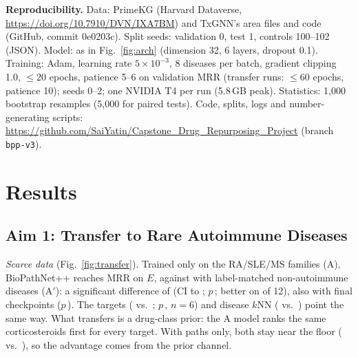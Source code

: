 \documentclass{svproc}
\newcommand{\sysname}{BioPathNet++\xspace}
\begin{document}
\textbf{Reproducibility.} Data: PrimeKG (Harvard Dataverse, \url{https://doi.org/10.7910/DVN/IXA7BM}) and TxGNN's area files and code (GitHub, commit 0e0203c). Split seeds: validation 0, test 1, controls 100--102 (JSON). Model: as in Fig.~\ref{fig:arch} (dimension 32, 6 layers, dropout 0.1). Training: Adam, learning rate $5\times10^{-3}$, 8 diseases per batch, gradient clipping 1.0, $\leq$20 epochs, patience 5--6 on validation MRR (transfer runs: $\leq$60 epochs, patience 10); seeds 0--2; one NVIDIA T4 per run (5.8\,GB peak). Statistics: 1,000 bootstrap resamples (5,000 for paired tests). Code, splits, logs and number-generating scripts: \url{https://github.com/SaiYatin/Capstone_Drug_Repurposing_Project} (branch \texttt{bpp-v3}).

\section{Results}\label{sec:results}
\subsection{Aim 1: Transfer to Rare Autoimmune Diseases}
\emph{Scarce data} (Fig.~\ref{fig:transfer}). Trained only on the RA/SLE/MS families (A), \sysname reaches MRR \TrAEMrr{} on $E$, against \TrActlEMrr{} with label-matched non-autoimmune diseases (A$'$): a significant difference of \DiffTrAActlE{} (CI \DiffLoTrAActlE{} to \DiffHiTrAActlE; $p$\,\PwilTrAActlE; better on \WinsTrAActlE{} of 12), also with final checkpoints ($p$\,\PwilTrAActlELast). The targets (\TrATargetsMrr{} vs.\ \TrActlTargetsMrr; $p$\,\PwilTrAActlTargets, $n=6$) and disease $k$NN (\TrAEKnnMrr{} vs.\ \TrActlEKnnMrr) point the same way. What transfers is a drug-class prior: the A model ranks the same corticosteroids first for every target. With paths only, both stay near the floor (\TrAPathsEMrr{} vs.\ \TrActlPathsEMrr), so the advantage comes from the prior channel.
\end{document}
